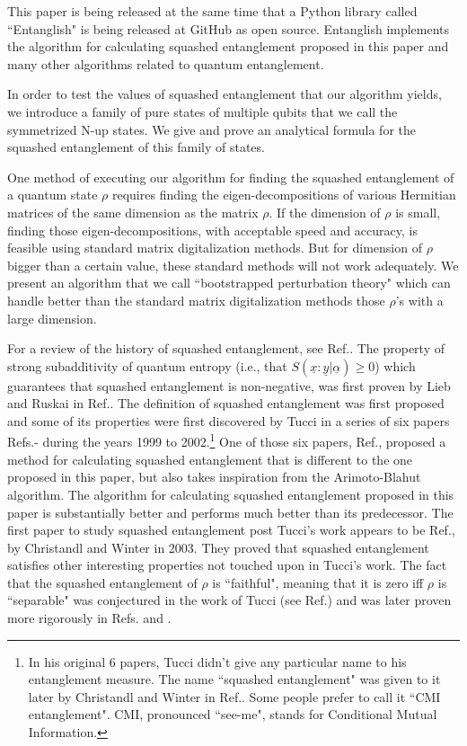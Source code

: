 \documentclass[12pt]{article}%
\newcommand{\ul}[1]{\underline{#1}}
\newcommand{\rvx}[0]{{\ul{x}}}
\newcommand{\rvy}[0]{{\ul{y}}}
\newcommand{\rvalp}[0]{{\ul{\alpha}}}
\begin{document}
This paper is being released at the same time that
a Python library called ``Entanglish"
is being released at GitHub as open source.
Entanglish implements the algorithm for
calculating squashed entanglement proposed
in this paper and many other algorithms related
to quantum entanglement.

In order to test
the values of squashed
entanglement that our algorithm
yields, we introduce
a family of pure states of multiple qubits
that we call the symmetrized N-up states.
We give and prove an analytical formula
for the squashed entanglement of this
family of states.

One method of executing our algorithm for finding the
squashed entanglement of a quantum state $\rho$ requires
finding the eigen-decompositions of
various Hermitian matrices
of the same dimension
as the matrix $\rho$.
If the dimension of $\rho$
is small, finding
those eigen-decompositions,
with acceptable
speed and accuracy,
is feasible
using standard matrix
digitalization methods.
But
for dimension of $\rho$
bigger than a certain
value, these standard methods
will not work adequately.
We present an algorithm
that we call ``bootstrapped perturbation
theory" which
can handle better
than the standard
matrix digitalization methods
those $\rho$'s
with a large dimension.

For a review of the history of squashed
entanglement, see Ref.\cite{sq-wiki}.
The property
of strong subadditivity
of quantum entropy (i.e., that
$S(\rvx:\rvy|\rvalp)\geq 0$)
which guarantees that
squashed entanglement is non-negative, was first proven by Lieb and Ruskai in Ref.\cite{subadd-proof}.
The definition of squashed entanglement was first
proposed
and some of its properties
were first discovered by Tucci in a series of six papers
Refs.\cite{Tuc99}-\cite{Tuc02}
during the years 1999 to 2002.\footnote{
In his original 6 papers, Tucci didn't give any particular name to
his entanglement measure. The
name ``squashed  entanglement" was given
to it later by Christandl and Winter in Ref.\cite{Chr03}.
Some people prefer to call it ``CMI entanglement". CMI,
pronounced ``see-me", stands for Conditional Mutual Information.}
One of those six papers, Ref.\cite{Tuc01a},
proposed a method
for calculating squashed
entanglement that is different to the one
proposed in this paper, but also takes inspiration
from the Arimoto-Blahut algorithm.
The algorithm for calculating squashed
entanglement proposed in this paper
is substantially better and performs much better than its
predecessor.
The first paper to study
squashed entanglement
post Tucci's work appears to be
Ref.\cite{Chr03}, by Christandl and Winter in 2003.
They proved that squashed entanglement
satisfies other interesting properties
not touched upon in Tucci's work.
The fact that the squashed entanglement
of $\rho$ is
``faithful", meaning that it
is zero iff $\rho$ is ``separable"
was conjectured in the work of Tucci
(see  Ref.\cite{Tuc00a}) and was later proven
more rigorously in Refs.\cite{sep-proof1} and \cite{sep-proof2}.
\end{document}

